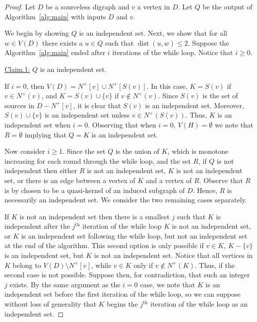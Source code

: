 \documentclass[12pt]{article}
\theoremstyle{definition}
\DeclareMathOperator{\dist}{dist}
\begin{document}
\begin{proof}
    Let $D$ be a sourceless digraph and $v$ a vertex in $D$.
    Let $Q$ be the output of Algorithm~\ref{alg:main} with inputs $D$ and $v$.
    
    We begin by showing $Q$ is an independent set.
    Next, we show that for all $w \in V(D)$ there exists a $u\in Q$ such that $\dist(u,w)\leq 2$.
    Suppose the Algorithm~\ref{alg:main} ended after $i$ iterations of the while loop.
    Notice that $i\geq 0$.

\vspace{0.25cm}
\noindent\underline{Claim.1:} $Q$ is an independent set.
\vspace{0.25cm}  

    If $i = 0$, then $V(D) = N^+{[v]} \cup N^+[S(v)]$.
    In this case, $K = S(v)$ if $v \in N^+(v)$, and $K = S(v) \cup \{v\}$ if $v \notin N^+(v)$.
    Since $S(v)$ is the set of sources in $D-N^+[v]$, it is clear that $S(v)$ is an independent set.
    Moreover, $S(v) \cup \{v\}$ is an independent set unless $v \in N^+(S(v))$.
    Thus, $K$ is an independent set when $i = 0$.
    Observing that when $i = 0$, $V(H) = \emptyset$ we note that $R = \emptyset$
    implying that $Q = K$ is an independent set.

    Now consider $i\geq 1$.
    Since the set $Q$ is the union of $K$, 
    which is monotone increasing for each round through the while loop,
    and the set $R$,
    if $Q$ is not independent then either 
    $R$ is not an independent set, 
    $K$ is not an independent set,
    or there is an edge between a vertex of $K$ and a vertex of $R$.
    Observe that $R$ is by chosen to be a quasi-kernel of an induced subgraph of $D$.
    Hence, $R$ is necessarily an independent set.
    We consider the two remaining cases separately.

    If $K$ is not an independent set then there is a smallest $j$ such that $K$ is independent after the 
    $j^{\text{th}}$ iteration of the while loop $K$ is not an independent set, or $K$ is an independent set following the while loop,
    but not an independent set at the end of the algorithm.
    This second option is only possible if $v \in K$, $K - \{v\}$ is an independent set, 
    but $K$ is not an independent set.
    Notice that all vertices in $K$ belong to $V(D)\setminus N^+[v]$,
    while $v \in K$ only if $v \notin N^+(K)$.
    Thus, if the second case is not possible.
    Suppose then, for contradiction, that such an integer $j$ exists.
    By the same argument as the $i=0$ case, we note that $K$ is an independent set before the first iteration of the while loop, 
    so we can suppose without loss of generality that $K$ begins the $j^{\text{th}}$ iteration of the while loop as an independent set.


\end{proof}
\end{document}
